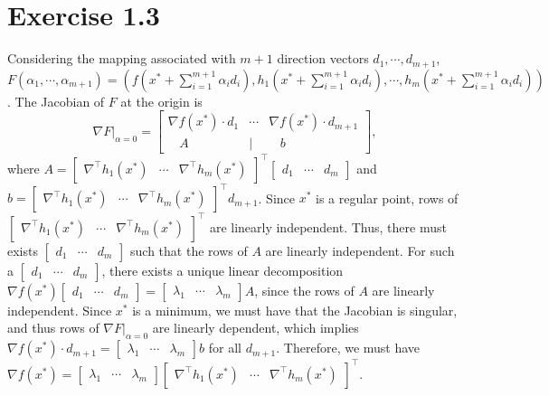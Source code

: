 \documentclass[11pt]{report}
\newcommand{\T}{\intercal}
\begin{document}
\section*{Exercise 1.3}
Considering the mapping associated with $m+1$ direction vectors $d_1,\cdots,d_{m+1}$, $F(\alpha_1,\cdots,\alpha_{m+1}) = \left(f(x^*+\sum_{i=1}^{m+1}\alpha_i d_i), h_1(x^*+\sum_{i=1}^{m+1}\alpha_i d_i), \cdots, h_{m}(x^*+\sum_{i=1}^{m+1}\alpha_i d_i)\right)$. The Jacobian of $F$ at the origin is
\[\nabla F|_{\alpha = 0} = \begin{bmatrix} \nabla f(x^*) \cdot d_1 & \cdots & \nabla f(x^*) \cdot d_{m+1}\\
~~~~A~~~~~~~~~~~~~~&|&~~~~b
\end{bmatrix},
\] where $A = \begin{bmatrix} \nabla^\T h_1(x^*) & \cdots & \nabla^\T h_{m}(x^*)
\end{bmatrix}^\T \begin{bmatrix} d_1 & \cdots & d_{m}
\end{bmatrix}$ and $b = \begin{bmatrix} \nabla^\T h_1(x^*) & \cdots & \nabla^\T h_{m}(x^*)
\end{bmatrix}^\T d_{m+1}$. Since $x^*$ is a regular point, rows of $\begin{bmatrix} \nabla^\T h_1(x^*) & \cdots & \nabla^\T h_{m}(x^*)
\end{bmatrix}^\T$ are linearly independent. Thus, there must exists $\begin{bmatrix} d_1 & \cdots & d_{m}
\end{bmatrix}$ such that the rows of $A$ are linearly independent. For such a $\begin{bmatrix} d_1 & \cdots & d_{m}
\end{bmatrix}$, there exists a unique linear decomposition $\nabla f(x^*) \begin{bmatrix} d_1 & \cdots & d_{m}\end{bmatrix} = \begin{bmatrix}\lambda_1 & \cdots & \lambda_m\end{bmatrix} A$, since the rows of $A$ are linearly independent. Since $x^*$ is a minimum, we must have that the Jacobian is singular, and thus rows of $\nabla F|_{\alpha = 0}$ are linearly dependent, which implies $\nabla f(x^*) \cdot d_{m+1} = \begin{bmatrix}\lambda_1 & \cdots & \lambda_m\end{bmatrix} b$ for all $d_{m+1}$. Therefore, we must have $\nabla f(x^*) = \begin{bmatrix}\lambda_1 & \cdots & \lambda_m\end{bmatrix} \begin{bmatrix} \nabla^\T h_1(x^*) & \cdots & \nabla^\T h_{m}(x^*)
\end{bmatrix}^\T$.
\end{document}
